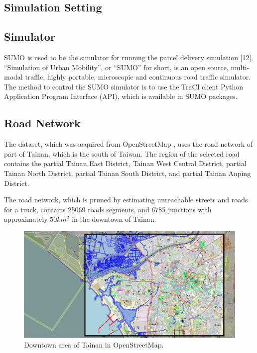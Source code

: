 \documentclass[12pt]{ksthesis}
\begin{document}
\begin{thesis}
{\section{Simulation Setting}

\subsection{Simulator}
SUMO is used to be the simulator for running the parcel delivery simulation [12]. “Simulation of Urban Mobility”, or “SUMO” for short, is an open source, multi-modal traffic, highly portable, microscopic and continuous road traffic simulator. The method to control the SUMO simulator is to use the TraCI client Python Application Program Interface (API), which is available in SUMO packages.

\subsection{Road Network}

The dataset, which was acquired from OpenStreetMap \cite{Haklay2008} , uses the road network of part of Tainan, which is the south of Taiwan. The region of the selected road contains the partial Tainan East District, Tainan West Central District, partial Tainan North District, partial Tainan South District, and partial Tainan Anping District.

The road network, which is pruned by estimating unreachable streets and roads for a truck, contains 25069 roads segments, and 6785 junctions with approximately $50km^{2}$ in the downtown of Tainan.

\begin{figure}[H]
\centering
\includegraphics[width=1.0\textwidth]{./Thesis_figures/F7-1_Openstreetmap.PNG}
\caption{\large Downtown area of Tainan in OpenStreetMap.}
\vspace{0.5cm}
\label{Fig:DowntownArea_in_OpenStreetMap.}
\end{figure}


}
\end{thesis}
\end{document}
